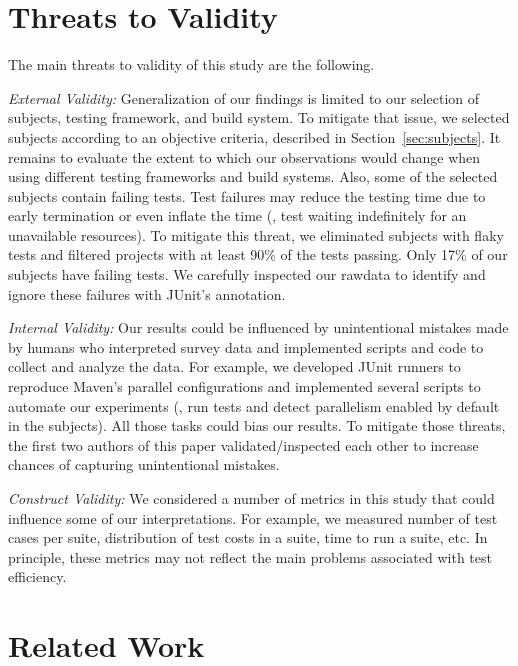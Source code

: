 \documentclass[10pt,journal,compsoc]{IEEEtran}
\begin{document}
\section{Threats to Validity}

The main threats to validity of this study are the following.

\textit{External Validity:} Generalization of our findings is limited
to our selection of subjects, testing framework, and build system.  To
mitigate that issue, we selected subjects according to an objective
criteria, described in Section~\ref{sec:subjects}.  It remains to
evaluate the extent to which our observations would change when using
different testing frameworks and build systems.
Also, some of the selected subjects contain failing tests. Test
failures may reduce the testing time due to early termination
or even inflate the time (\eg, test waiting indefinitely for
an unavailable resources).
To mitigate this threat, we eliminated subjects with flaky tests and
filtered projects with at least 90\% of the tests passing.
Only 17\% of our subjects have failing tests.
We carefully inspected our rawdata to identify and ignore these
failures with JUnit's  annotation.

\textit{Internal Validity:} Our results could be influenced by
unintentional mistakes made by humans who interpreted survey data and
implemented scripts and code to collect and analyze the data.
For example, we developed JUnit runners to reproduce Maven's parallel
configurations and implemented several scripts to automate our
experiments (\eg, run tests and detect parallelism enabled by default
in the subjects).
All those tasks could bias our results.
To mitigate those threats, the first two authors of this paper
validated/inspected each other to increase chances of capturing
unintentional mistakes.

\textit{Construct Validity:} We considered a number of metrics in this
study that could influence some of our interpretations.  For example,
we measured number of test cases per suite, distribution of test costs
in a suite, time to run a suite, etc.  In principle, these metrics may
not reflect the main problems associated with test
efficiency.


\section{Related Work}
\label{sec:related}
\end{document}
